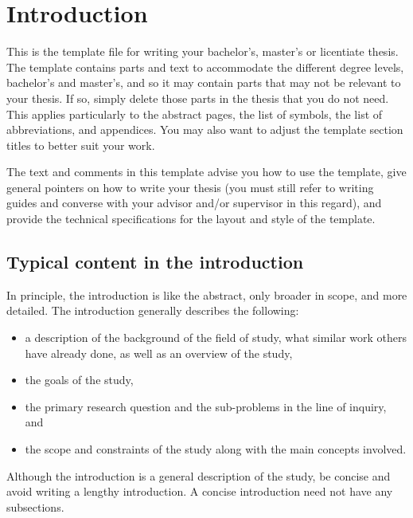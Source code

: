\section{Introduction}
\label{sec:intro}

\thispagestyle{empty}

This is the template file for writing your bachelor’s, master’s or licentiate 
thesis. The template contains parts and text to accommodate the different degree 
levels, bachelor’s and master’s, and so it may contain parts that may not be 
relevant to your thesis. If so, simply delete those parts in the thesis that you
do not need. This applies particularly to the abstract pages, the list of
symbols, the list of abbreviations, and appendices. You may also want to adjust
the template section titles to better suit your work.

The text and comments in this template advise you how to use the template, give 
general pointers on how to write your thesis (you must still refer to writing
guides and converse with your advisor and/or supervisor in this regard), and
provide the technical specifications for the layout and style of the template.

\subsection{Typical content in the introduction}

In principle, the introduction is like the abstract, only broader in scope, and
more detailed. The introduction generally describes the following:

\begin{itemize}
	\item[--] a description of the background of the field of study, what
	similar work others have already done, as well as an overview of the study,
	\item[--] the goals of the study,
	\item[--] the primary research question and the sub-problems in the line
	of inquiry, and
	\item[--] the scope and constraints of the study along with the main
	concepts involved.
\end{itemize}

Although the introduction is a general description of the study, be concise and 
avoid writing a lengthy introduction. A concise introduction need not have any 
subsections.

\clearpage
